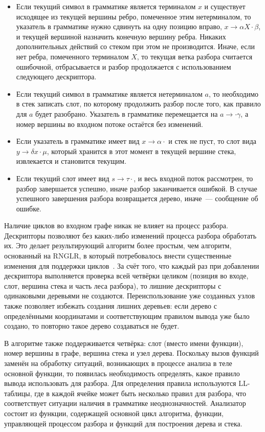 \begin{itemize}
\item Если текущий символ в грамматике является терминалом $x$ и существует исходящее из текущей вершины ребро, помеченное этим нетерминалом, то указатель в грамматике нужно сдвинуть на одну позицию вправо, $x \rightarrow \alpha X \cdot \beta$, и текущей вершиной назначить конечную вершину ребра. Никаких дополнительных действий со стеком при этом не производится. Иначе, если нет ребра, помеченного терминалом $X$, то текущая ветка разбора считается ошибочной, отбрасывается и  разбор продолжается с использованием следующего дескриптора.
\item Если текущий символ в грамматике является нетерминалом $a$, то необходимо в стек записать слот, по которому продолжить разбор после того, как правило для $a$ будет разобрано. Указатель в грамматике перемещается на $a \rightarrow \cdot \gamma $, а номер вершины во входном потоке остаётся без изменений.
\item Если указатель в грамматике имеет вид $x \rightarrow \alpha\cdot$ и стек не пуст, то слот вида $y \rightarrow \delta x \cdot \mu$, который хранится в этот момент в текущей вершине стека, извлекается и становится текущим.
\item Если текущий слот имеет вид $s \rightarrow \tau\cdot$, и весь входной поток рассмотрен, то разбор завершается успешно, иначе разбор заканчивается ошибкой. В случае успешного завершения разбора возвращается дерево, иначе~--- сообщение об ошибке.
\end{itemize}

Наличие циклов во входном графе никак не влияет на процесс разбора. Дескрипторы позволяют без каких-либо изменений процесса разбора обработать их. Это делает результирующий алгоритм более простым, чем алгоритм, основанный на RNGLR, в который потребовалось внести существенные изменения для поддержки циклов~\cite{RelaxedARNGLR}. За счёт того, что каждый раз при добавлении дескриптора выполняется проверка всей четвёрки целиком (позиция во входе, слот, вершина стека и часть леса разбора), то лишние дескрипторы с одинаковыми деревьями не создаются. Переиспользование уже созданных узлов также позволяет избежать создания лишних деревьев: если дерево с определёнными координатами и соответствующим правилом вывода уже было создано, то повторно такое дерево создаваться не будет.

В алгоритме также поддерживается четвёрка: слот (вместо имени функции), номер вершины в графе, вершина стека и узел дерева. Поскольку вызов функций заменён на обработку ситуаций, возникающих в процессе анализа в теле основной функции, то появилась необходимость определять, какое правило вывода использовать для разбора. Для определения правила используются LL-таблицы, где в каждой ячейке может быть несколько правил для разбора, что соответствует ситуации наличия в грамматике неоднозначностей. Анализатор состоит из функции, содержащей основной цикл алгоритма, функции, управляющей процессом разбора и функций для построения дерева и стека.

